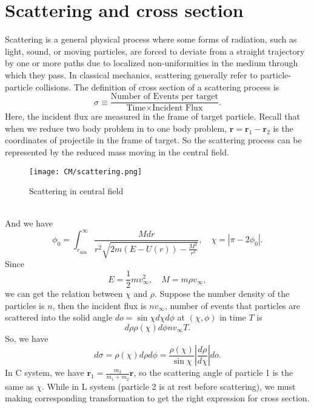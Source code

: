 \section{Scattering and cross section}
Scattering is a general physical process where some forms of radiation, such as light, sound, or moving particles, are forced to deviate from a straight trajectory by one or more paths due to localized non-uniformities in the medium through which they pass.  In classical mechanics, scattering generally refer to particle-particle collisions.
The definition of cross section  of a scattering process is
\[\sigma \equiv \frac{\mbox{Number of Events per target}}{\mbox{Time} \times \mbox{Incident Flux}}.\]
Here, the incident flux are measured in the frame of target particle. Recall that when we reduce two body problem in to one body problem, $\bm{r} = \bm{r}_1 - \bm{r}_2$ is the coordinates of projectile in the frame of target. So the scattering process can be represented by the reduced mass moving in the central field. 
\begin{figure}[!h]
	\centering
	\texttt{[image: CM/scattering.png]}
	\caption{Scattering in central field}
\end{figure}
\\
And we have
\[\phi_0 = \int_{r_{\mathrm{min}}}^{\infty} \frac{Mdr}{r^2 \sqrt{2m(E-U(r))-\frac{M^2}{r^2}}} ,\quad \chi = |\pi - 2\phi_0|.\]
Since
\[E = \frac{1}{2}m v_{\infty}^2 ,\quad M = m\rho v_{\infty},\]
we can get the relation between  $\chi$ and $\rho$. Suppose the number density of the particles is $n$, then the incident flux is $nv_{\infty}$, number of events that particles are scattered into the solid angle $do = \sin\chi d\chi d\phi$ at $(\chi,\phi)$ in time $T$ is
\[d\rho \rho(\chi) d\phi nv_{\infty} T .\]
So, we have
\[d\sigma = \rho(\chi) d\rho d\phi = \frac{\rho(\chi)}{\sin\chi} \left| \frac{d\rho}{d\chi} \right| do.\]
In C system, we have $\bm{r}_1 = \frac{m_2}{m_1+m_2} \bm{r}$, so the scattering angle of particle 1 is the same as $\chi$. While in L system (particle 2 is at rest before scattering), we must making corresponding transformation to get the right expression for cross section.

